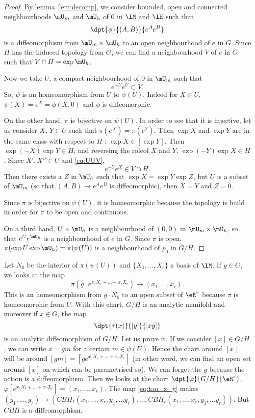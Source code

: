 \begin{proof}
By lemma \ref{lem:decomp}, we consider bounded, open and connected neighbourhoods $\mU_m$ and $\mU_h$ of $0$ in $\lM$ and $\lH$ such that 
\[
  \dpt{\phi}{(A,B)}{e^Ae^B}
\]
is a diffeomorphism from $\mU_m\times\mU_h$ to an open neighbourhood of $e$ in $G$. Since $H$ has the induced topology from $G$, we can find a neighbourhood $V$ of $e$ in $G$ such that $V\cap H=\exp\mU_h$. 

Now we take $U$, a compact neighbourhood of $0$ in $\mU_m$ such that 
\begin{equation}\label{eq:UUV}
  e^{-U}e^{U}\subset V.
\end{equation}
So, $\psi$ is an homeomorphism from $U$ to $\psi(U)$. Indeed for $X\in U$, $\psi(X)=e^X=\phi(X,0)$ and $\phi$ is diffeomorphic. 

On the other hand, $\pi$ is bijective on $\psi(U)$. In order to see that it is injective, let us consider $X$, $Y\in U$ such that $\pi(e^{X})=\pi(e^{Y})$. Then $\exp X$ and $\exp Y$ are in the same class with respect to $H$ : $\exp X\in[\exp Y]$. Then $\exp(-X)\exp Y\in H$, and reversing the role\angl of $X$ and $Y$, $\exp(-Y)\exp X\in H$. Since $X',X''\in U$ and \eqref{eq:UUV}, 
\[
  e^{-Y}e^{X}\in V\cap H.
\]
Then there exists a $Z$ in $\mU_h$ such that $\exp X=\exp Y\exp Z$, but $U$ is a subset of $\mU_m$ (so that $(A,B)\to e^Ae^B$ is diffeomorphic), then $X=Y$ and $Z=0$.

Since $\pi$ is bijective on $\psi(U)$, it is homeomorphic because the topology is build in order for $\pi$ to be open and continuous.

On a third hand, $U\times\mU_h$ is a neighbourhood of $(0,0)$ in $\mU_m\times\mU_h$, so that $e^Ue^{\mU_h}$ is a neighbourhood of $e$ in $G$. Since $\pi$ is open, $\pi(\exp U\exp \mU_h)=\pi(\psi(U))$ is a neighbourhood of $p_0$ in $G/H$.
\end{proof}


Let $N_0$ be the interior of $\pi(\psi(U))$ and $\{X_1,\ldots, X_r\}$ a basis of $\lM$. If $g\in G$, we looks at the map
\[
  \pi(g\cdot e^{x_1X_1+\ldots+x_rX_r})\to(x_1,\ldots,x_r).
\]
This is an homeomorphism from $g\cdot N_0$ to an open subset of $\eR^r$ because $\pi$ is homeomorphic from $U$. With this chart, $G/H$ is an analytic manifold  and moreover if $x\in G$, the map
\begin{equation}\label{eq:tau_x_y}
  \dpt{\tau(x)}{[y]}{[xy]}
\end{equation}
is an analytic diffeomorphism of $G/H$. Let us prove it. If we consider $[x]\in G/H$, we can write $x=gm$ for a certain $m\in\psi(U)$. Hence the chart around $[x]$ will be around $[gm]=[ge^{x_1X_1+\ldots+x_rX_r}]$ (in other word, we can find an open set around $[x]$ on which can be parametrised so). We can forget the $g$ because the action is a diffeomorphism. Then we looks at the chart $\dpt{\varphi}{G/H}{\eR^r}$, $\varphi[e^{x_1X_1+\ldots+x_rX_r}]=(x_1,\ldots,x_r)$. The map \eqref{eq:tau_x_y} makes $(y_1,\ldots,y_r)\to( CBH_1(x_1,\ldots,x_r,y_1,\ldots y_r),\ldots, CBH_r(x_1,\ldots,x_r,y_1,\ldots y_r))$. But $CBH$ is a diffeomorphism.



